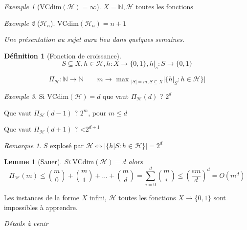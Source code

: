 \documentclass{article}
\newtheorem{lemma}[theorem]{Lemme}
\theoremstyle{definition}
\newtheorem{definition}{Définition}[section]
\theoremstyle{remark}
\newtheorem*{remark}{Remarque}
\newtheorem*{example}{Exemple}
\begin{document}
\begin{example}[$\mbox{VCdim}(\mathcal{H})=\infty$]
    $X=\mathbb{N}, \mathcal{H} \mbox{ toutes les fonctions}$
\end{example}

\begin{example}[$\mathcal{H}_n$]
    $\mbox{VCdim}(\mathcal{H}_n)=n+1$
    
    \textit{Une présentation au sujet aura lieu dans quelques semaines.}
\end{example}

\begin{definition}[Fonction de croissance]
    \begin{equation*}
        S\subseteq X, h\in\mathcal{H}, h:X\to\{0,1\},h|_s:S\to\{0,1\}
    \end{equation*}
    
    \begin{equation}
        \Pi_{\mathcal{H}} : \mathbb{N}\to\mathbb{N}\quad\quad m\to\mbox{ max }_{|S|=m, S\subseteq X} |\{h|_S :h\in\mathcal{H}\}|
    \end{equation}
\end{definition}

\begin{example}
    Si $\mbox{VCdim}(\mathcal{H})=d$ que vaut $\Pi_{\mathcal{H}}(d)$ ? $2^d$
    
    Que vaut $\Pi_{\mathcal{H}}(d-1)$ ? $2^m$, pour $m\leq d$
    
    Que vaut $\Pi_{\mathcal{H}}(d+1)$ ? <$2^{d+1}$
\end{example}

\begin{remark}
    $S$ explosé par $\mathcal{H} \Leftrightarrow |\{h|S : h\in\mathcal{H}\}|=2^d$
\end{remark}

\begin{lemma}[Sauer]
    Si $\mbox{VCdim}(\mathcal{H})=d$ alors 
    $$\Pi_{\mathcal{H}}(m)\leq\binom{m}{0}+\binom{m}{1}+...+\binom{m}{d}=\sum_{i=0}^d \binom{m}{i}\leq(\frac{em}{d})^d=O(m^d)$$
\end{lemma}

Les instances de la forme $X$ infini, $\mathcal{H}$ toutes les fonctions $X\to\{0,1\}$ sont impossibles à apprendre.

\textit{Détails à venir}
\end{document}

